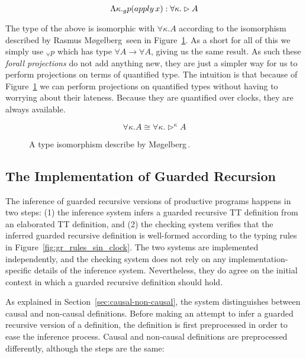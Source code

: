 \[
\Lambda \kappa . _gp (apply\,x) : \forall \kappa . \rhd A
\]

The type of the above is isomorphic with $\forall \kappa . A$ according to the
isomorphism described by Rasmus M\o gelberg\,\cite{Mogelberg:2014} seen in
Figure~\ref{fig:quantified_later_iso}. As a short for all of this we simply use
$_\forall p$ which has type $\forall A \rightarrow \forall A$, giving us the
same result. As such these \emph{forall projections} do not add anything new,
they are just a simpler way for us to perform projections on terms of quantified
type. The intuition is that because of Figure~\ref{fig:quantified_later_iso} we
can perform projections on quantified types without having to worrying about
their lateness. Because they are quantified over clocks, they are always available.

\begin{figure}[h]
\[
\forall \kappa .A\cong \forall \kappa .\rhd ^\kappa A
\]
  \caption{A type isomorphism describe by M\o gelberg\,\cite{Mogelberg:2014}.}
  \label{fig:quantified_later_iso}
\end{figure}


\subsection{The Implementation of Guarded Recursion}
\label{sec:impl-guard-recurs}

The inference of guarded recursive versions of productive programs
happens in two steps: (1) the inference system infers a guarded
recursive TT definition from an elaborated TT definition, and (2) the checking
system verifies that the inferred guarded recursive definition is well-formed
according to the typing rules in Figure~\ref{fig:gr_rules_sin_clock}. The two
systems are implemented independently, and the checking system does not rely on
any implementation-specific details of the inference system. Nevertheless, they do agree on
the initial context in which a guarded recursive definition should hold.

As explained in Section~\ref{sec:causal-non-causal}, the system distinguishes between
causal and non-causal definitions. Before making an attempt to infer a guarded
recursive version of a definition, the definition is first preprocessed in order
to ease the inference process. Causal and non-causal definitions are
preprocessed differently, although the steps are the same:

